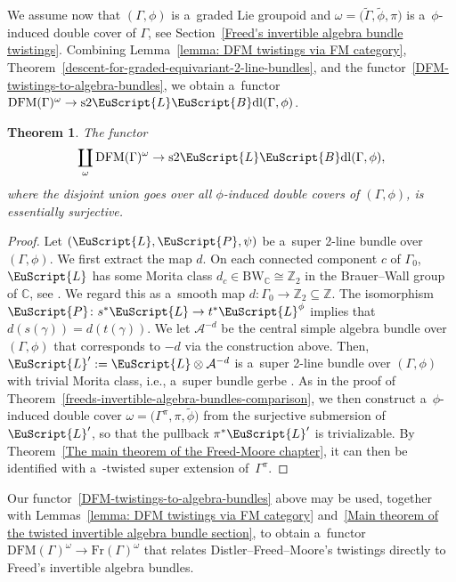 \documentclass[pdftex]{sigma}
\numberwithin{equation}{section}
\newtheorem{Theorem}{Theorem}[section]
\def\mathscr#1{\EuScript{#1}}
\def\Z {\mathbb{Z}}
\def\C {\mathbb{C}}
\def\subset{\subseteq}
\newcommand{\LineBdl}{\mathscr{L}\mathscr{B}\mathrm{dl}}
\newcommand{\stwoLineBdl}{\mathrm{s}2\LineBdl}
\begin{document}
We assume now that $(\Gamma,\phi)$ is a~graded Lie groupoid and
$\omega=\bigl(\tilde\Gamma,\tilde\phi,\pi\bigr)$ is a~$\phi$-induced double cover of $\Gamma$, see Section~\ref{Freed's invertible algebra bundle twistings}. Combining Lemma~\ref{lemma: DFM twistings via FM category}, Theorem~\ref{descent-for-graded-equivariant-2-line-bundles}, and
the functor~\eqref{DFM-twistings-to-algebra-bundles}, we obtain a~functor
$\mathrm{DFM}(\Gamma)^\omega
\to
\stwoLineBdl(\Gamma,\phi)$.

\begin{Theorem}
\label{freed-distler-moore-comparison}
The functor
\begin{equation*}
\coprod_{\omega}\mathrm{DFM}(\Gamma)^\omega\to \stwoLineBdl(\Gamma,\phi),
\end{equation*}
where the disjoint union goes over all $\phi$-induced double covers of $(\Gamma,\phi)$, is essentially surjective.
\end{Theorem}

\begin{proof}
Let $(\mathscr{L},\mathscr{P},\psi)$ be a~super 2-line bundle over $(\Gamma,\phi)$. We first extract the map $d$. On each connected component $c$ of $\Gamma_0$, $\mathscr{L}$ has some Morita class $d_c \in \mathrm{BW}_{\C}\cong \Z_2$ in the Brauer--Wall group of $\C$, see \cite[Section~3.1]{Kristel2020}.
We regard this as a~smooth map $d \colon \Gamma_0 \to \Z_2 \subset \Z$. The isomorphism~${\mathscr{P}\colon s^{*}\mathscr{L} \to t^{*}\mathscr{L}^{\phi}}$ implies that $d(s(\gamma))= d(t(\gamma))$. %
We let $\mathcal{A}^{-d}$ be the central simple algebra bundle over $(\Gamma,\phi)$ that corresponds to $-d$ via the construction above.
Then, $\mathscr{L}':=\mathscr{L} \otimes \mathcal{A}^{-d}$ is a~super 2-line bundle over $(\Gamma,\phi)$ with trivial Morita class, i.e., a~super bundle gerbe \cite[Proposition~3.2.4]{Kristel2020}. As in the proof of Theorem~\ref{freeds-invertible-algebra-bundles-comparison}, we then construct a~$\phi$-induced double cover $\omega=\bigl(\Gamma^{\pi},\pi,\tilde\phi\bigr)$ from the surjective submersion of $\mathscr{L}'$, so that the pullback $\pi^{*}\mathscr{L}'$ is trivializable. By Theorem~\ref{The main theorem of the Freed-Moore chapter}, it can then be identified with a~\smash{$\tilde\phi$}-twisted super extension of~$\Gamma^{\pi}$.
\end{proof}

\begin{Remark}
Our functor~\eqref{DFM-twistings-to-algebra-bundles} above may be used, together with Lemmas~\ref{lemma: DFM twistings via FM category} and~\ref{Main theorem of the twisted invertible algebra bundle section}, to obtain a~functor
$
\mathrm{DFM}(\Gamma)^\omega \to \mathrm{Fr}(\Gamma)^{\omega}
$
that relates Distler--Freed--Moore's twistings directly to Freed's invertible algebra bundles.
\end{Remark}
\end{document}
